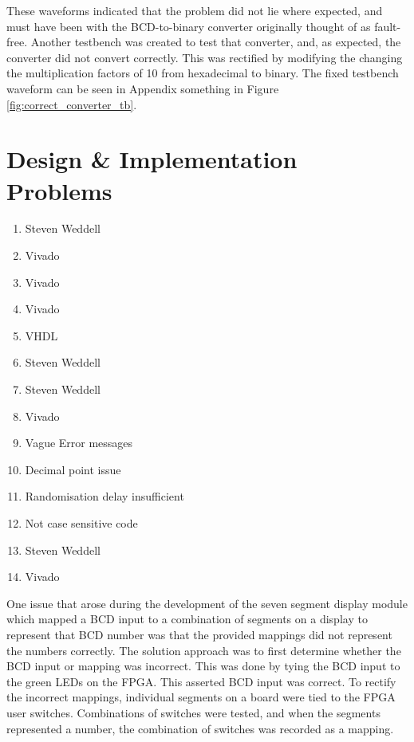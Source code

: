 \documentclass[11pt]{article}
\begin{document}
These waveforms indicated that the problem did not lie where expected, and must have been with the BCD-to-binary converter originally thought of as fault-free. Another testbench was created to test that converter, and, as expected, the converter did not convert correctly. This was rectified by modifying the changing the multiplication factors of 10 from hexadecimal to binary. The fixed testbench waveform can be seen in Appendix something in Figure \ref{fig:correct_converter_tb}.

\newpage

\section{Design \& Implementation Problems}


\begin{enumerate}
  \item Steven Weddell
  \item Vivado
  \item Vivado
  \item Vivado
  \item VHDL
  \item Steven Weddell
  \item Steven Weddell
  \item Vivado
  \item Vague Error messages
  \item Decimal point issue
  \item Randomisation delay insufficient
  \item Not case sensitive code
  \item Steven Weddell
  \item Vivado
\end{enumerate}

One issue that arose during the development of the seven segment display module which mapped a BCD input to a combination of segments on a display to represent that BCD number was that the provided mappings did not represent the numbers correctly. The solution approach was to first determine whether the BCD input or mapping was incorrect. This was done by tying the BCD input to the green LEDs on the FPGA. This asserted BCD input was correct. To rectify the incorrect mappings, individual segments on a board were tied to the FPGA user switches. Combinations of switches were tested, and when the segments represented a number, the combination of switches was recorded as a mapping.
\end{document}
